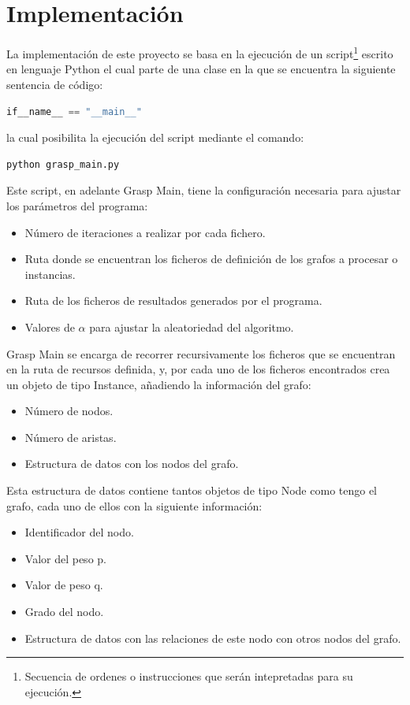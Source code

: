 \section{Implementación}
\label{sec:implementacion}
La implementación de este proyecto se basa en la ejecución de un script\footnote{Secuencia de ordenes o instrucciones que serán intepretadas para su ejecución.} escrito en lenguaje Python el cual parte de una clase en la que se encuentra la siguiente sentencia de código:
 \begin{lstlisting}[language=Python]
 if__name__ == "__main__"
 \end{lstlisting}
 la cual posibilita la ejecución del script mediante el comando:
  \begin{lstlisting}[language=bash]
  python grasp_main.py
 \end{lstlisting} 

 Este script, en adelante Grasp Main, tiene la configuración necesaria para ajustar los parámetros del programa:
 \begin{itemize}
 	\item Número de iteraciones a realizar por cada fichero.
 	\item Ruta donde se encuentran los ficheros de definición de los grafos a procesar o instancias.
 	\item Ruta de los ficheros de resultados generados por el programa.	
 	\item Valores de $\alpha$ para ajustar la aleatoriedad del algoritmo.
 \end{itemize}

Grasp Main se encarga de recorrer recursivamente los ficheros que se encuentran en la ruta de recursos definida, y, por cada uno de los ficheros encontrados crea un objeto de tipo Instance, añadiendo la información del grafo:
 \begin{itemize}
	\item Número de nodos.
	\item Número de aristas.
	\item Estructura de datos con los nodos del grafo.
\end{itemize}

Esta estructura de datos contiene tantos objetos de tipo Node como tengo el grafo, cada uno de ellos con la siguiente información:
 \begin{itemize}
	\item Identificador del nodo.
	\item Valor del peso p.
	\item Valor de peso q.
	\item Grado del nodo.
	\item Estructura de datos con las relaciones de este nodo con otros nodos del grafo.
\end{itemize}

